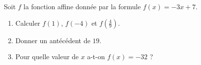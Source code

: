 
\begin{exercice}\label{exosmath-0510}

    Soit \( f\) la fonction affine donnée par la formule \( f(x)=-3x+7\).
    \begin{enumerate}
        \item
            Calculer \( f(1)\), \( f(-4)\) et \( f(\frac{ 4 }{ 9 })\).
        \item
            Donner un antécédent de \( 19\).
        \item
            Pour quelle valeur de \( x\) a-t-on \( f(x)=-32\) ?
    \end{enumerate}

\end{exercice}
